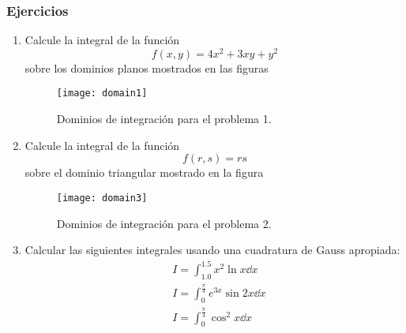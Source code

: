 \subsubsection{Ejercicios}
\begin{enumerate}

\item \label{punto01} Calcule la integral de la función
\[f(x,y)=4x^2+3xy+y^2\]
sobre los dominios planos mostrados en las figuras
\begin{figure}[H]
	\centering
	\texttt{[image: domain1]}
	\caption{Dominios de integración para el problema 1.}
	\label{fig:tan1}
\end{figure}

\item \label{punto02} Calcule la integral de la función
\[f(r,s)=rs\]
sobre el dominio triangular mostrado en la figura

\begin{figure}[H]
\centering
\texttt{[image: domain3]}
\caption{Dominios de integración para el problema 2.}
\label{fig:tan2}
\end{figure}
	
\item \label{punto03} Calcular las siguientes integrales usando una cuadratura 
de Gauss apropiada:
\begin{align*}
&I = \int_{1.0}^{1.5} x^2\ln x \dd{x} \\
&I = \int_0^\frac{\pi}{4} e^{3x} \sin2x\dd{x} \\
&I = \int_0^\frac{\pi}{4} \cos^2x\dd{x}
\end{align*}
	
\end{enumerate}
